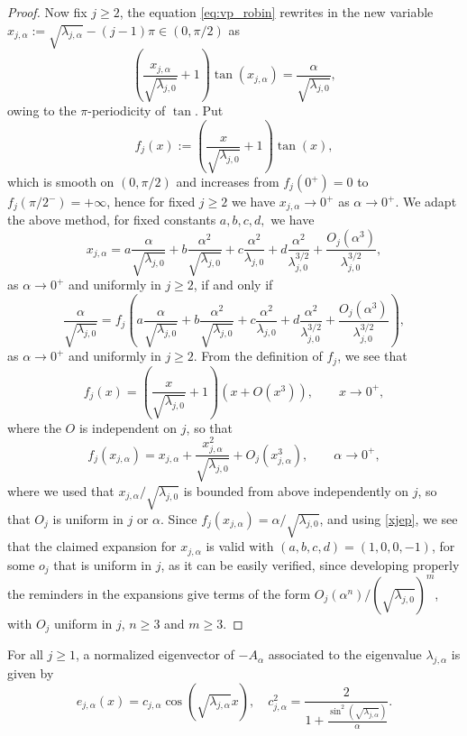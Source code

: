 \documentclass[10pt]{article}
\begin{document}
\begin{proof}
Now fix $j \geq 2$, the equation \eqref{eq:vp_robin} rewrites in the new variable $x_{j,\alpha} := \sqrt{\lambda_{j,\alpha}} - (j-1)\pi \in (0,\pi/2)$ as
\[
\left( \frac{x_{j,\alpha}}{\sqrt{\lambda_{j,0}}} + 1 \right) \tan(x_{j,\alpha}) = \frac{\alpha}{\sqrt{\lambda_{j,0}}},
\]
owing to the $\pi$-periodicity of $\tan$. Put 
\[
f_j(x) := \left( \frac{x}{\sqrt{\lambda_{j,0}}} + 1 \right) \tan(x),
\]
which is smooth on $(0,\pi/2)$ and increases from $f_j(0^+) = 0$ to $f_j(\pi/2^-) = +\infty$, hence for fixed $j \geq 2$ we have $x_{j,\alpha} \to 0^+$ as $\alpha \to 0^+$. We adapt the above method, for fixed constants $a,b,c,d,$ we have
\begin{equation}\label{xjep}
x_{j,\alpha} = a \frac{\alpha}{\sqrt{\lambda_{j,0}}} + b \frac{\alpha^2}{\sqrt{\lambda_{j,0}}} + c \frac{\alpha^2}{\lambda_{j,0}} + d \frac{\alpha^2}{\lambda_{j,0}^{3/2}} + \frac{O_j(\alpha^3)}{\lambda_{j,0}^{3/2}},
\end{equation}
as $\alpha \to 0^+$ and uniformly in $j \geq 2$, if and only if 
\[
\frac{\alpha}{\sqrt{\lambda_{j,0}}} = f_j\left(  a \frac{\alpha}{\sqrt{\lambda_{j,0}}} + b \frac{\alpha^2}{\sqrt{\lambda_{j,0}}} + c \frac{\alpha^2}{\lambda_{j,0}} + d \frac{\alpha^2}{\lambda_{j,0}^{3/2}} + \frac{O_j(\alpha^3)}{\lambda_{j,0}^{3/2}} \right),
\]
as $\alpha \to 0^+$ and uniformly in $j \geq 2$. From the definition of $f_j$, we see that
\[
f_j(x) = \left( \frac{x}{\sqrt{\lambda_{j,0}}} + 1 \right)\left(
x + O(x^3)\right),
\qquad x \to 0^+,
\]
where the $O$ is independent on $j$,
so that
\[
f_j(x_{j,\alpha})
=
x_{j,\alpha}+\frac{x_{j,\alpha}^2}{\sqrt{\lambda_{j,0}}}
+O_j(x_{j,\alpha}^3),
\qquad  \alpha \to 0^+,
\]
where we used that $x_{j,\alpha}/\sqrt{\lambda_{j,0}}$ is bounded from above independently on $j$,  so that  $O_j$ is uniform in $j$ or $\alpha$.
Since $f_j(x_{j,\alpha})={\alpha}/{\sqrt{\lambda_{j,0}}}$, and using \eqref{xjep}, we see that the claimed expansion for $x_{j,\alpha}$ is valid with $(a,b,c,d) = (1,0,0,-1)$, for some $o_j$ that is uniform in $j$, as it can be easily verified, since developing properly the reminders in the expansions give terms of the form $O_j(\alpha^n)/(\sqrt{\lambda_{j,0}})^m$, with $O_j$ uniform in $j$, $n\geqslant 3$ and $m\geqslant 3$.
\end{proof}
For all $j \geq 1$, a normalized eigenvector of $-A_\alpha$ associated to the eigenvalue $\lambda_{j,\alpha}$ is given by
\begin{equation}\label{eq:eigen_robin}
e_{j,\alpha}(x) = c_{j,\alpha} \cos(\sqrt{\lambda_{j,\alpha}} x),\quad c_{j,\alpha}^2 = \frac{2}{1+\displaystyle \frac{\sin^2(\sqrt{\lambda_{j,\alpha}})}{\alpha}}.
\end{equation}
\end{document}
